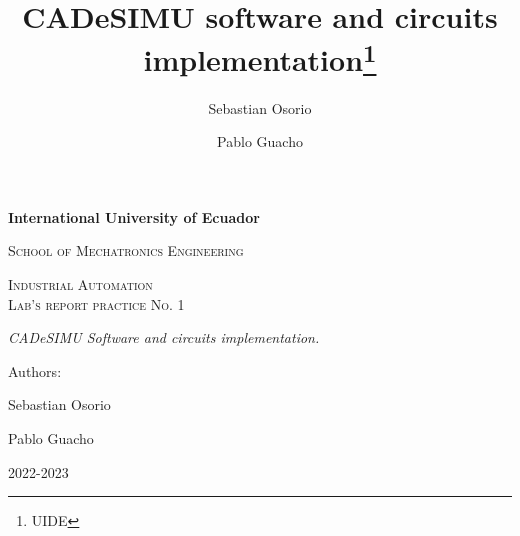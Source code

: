 \documentclass[runningheads]{llncs}
\begin{document}
\begin{titlepage}
    \centering
    {\bfseries\LARGE International University of Ecuador \par}
    \vspace{1cm}
    {\scshape\Large School of Mechatronics Engineering \par}
    \vspace{3cm}
    {\scshape\Huge Industrial Automation \\ Lab's report practice No. 1\par}
    \vspace{3cm}
    {\itshape\Large CADeSIMU Software and circuits implementation. \par}
    \vfill
    {\Large Authors: \par}
    {\Large Sebastian Osorio \par}
    {\Large Pablo Guacho \par}
    \vfill
    {\Large 2022-2023 \par}
\end{titlepage}
\newpage
\title{CADeSIMU software and circuits implementation\thanks{UIDE}}

\author{Sebastian Osorio
    \and
    Pablo Guacho
}



\maketitle
\end{document}
